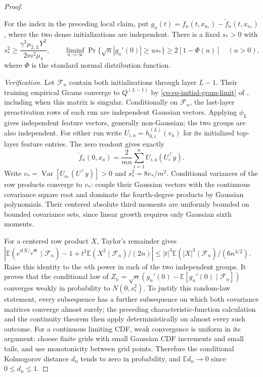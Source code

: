 \begin{proof}
\begin{claim}
\label{cp:scalar-fluctuation}
For the index in the preceding local claim, put
$g_n(t)=f_n(t,x_{a_*})-\widetilde f_n(t,x_{a_*})$, where the two
dense initializations are independent.  There is a fixed $s_*>0$ with
\begin{equation}
 s_*^2\ge\frac{\gamma^3\mu_{2,L}Y^2}{2m^2\mu_4},\qquad
 \liminf_{n\to\infty}\Pr\{\sqrt n|g_n'(0)|\ge u s_*\}
       \ge2[1-\Phi(u)]\quad(u>0),
 \label{cp:eq-scalar-fluctuation}
\end{equation}
where $\Phi$ is the standard normal distribution function.
\end{claim}
\emph{Verification.}
Let $\mathcal F_n$ contain both initializations through layer $L-1$.
Their training empirical Grams converge to $Q^{(L-1)}$ by
\eqref{cp:eq-initial-gram-limit} of , including when this
matrix is singular.
Conditionally on $\mathcal F_n$, the last-layer preactivation rows of
each run are independent Gaussian vectors. Applying $\phi_L$ gives
independent feature vectors, generally non-Gaussian; the two groups are
also independent.
For either run write $U_{i,a}=h_{0,i}^{(L)}(v_a)$ for its initialized
top-layer feature entries. The zero readout gives exactly
\[
 \dot f_n(0,x_a)=\frac2{mn}\sum_{i=1}^n U_{i,a}(U_i^\top y).
\]
Write $v_* =\operatorname{Var}[U_{a_*}(U^\top y)]>0$ and
$s_*^2=8v_*/m^2$.  Conditional variances of the row products converge
to $v_*$: couple their Gaussian vectors with the continuous covariance
square root and dominate the fourth-degree products by Gaussian
polynomials.  Their centered absolute third moments are uniformly
bounded on bounded covariance sets, since linear growth requires only
Gaussian sixth moments.

For a centered row product $X$, Taylor's remainder gives
$|\mathbb E(e^{itX/\sqrt n}\mid\mathcal F_n)
-1+t^2\mathbb E(X^2\mid\mathcal F_n)/(2n)|
\le |t|^3\mathbb E(|X|^3\mid\mathcal F_n)/(6n^{3/2})$.
Raise this identity to the $n$th power in each of the two independent
groups.  It proves that the conditional law of
$Z_n=\sqrt n(g_n'(0)-\mathbb E[g_n'(0)\mid\mathcal F_n])$
converges weakly in probability to $N(0,s_*^2)$.
To justify this random-law statement, every subsequence has a further
subsequence on which both covariance matrices converge almost surely;
the preceding characteristic-function calculation and the continuity
theorem then apply deterministically on almost every such outcome.
For a continuous limiting CDF, weak convergence is uniform in its
argument: choose finite grids with small Gaussian CDF increments and
small tails, and use monotonicity between grid points.  Therefore the
conditional Kolmogorov distance $d_n$ tends to zero in probability,
and $\mathbb E d_n\to0$ since $0\le d_n\le1$.


\end{proof}
